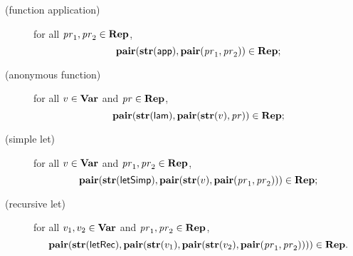 \begin{description}
\item[\quad(function application)] for all $\mathit{pr}_1,\mathit{pr}_2\in\mathbf{Rep}$,
  \begin{displaymath}
    \mathbf{pair}(\mathbf{str}(\mathsf{app}),
    \mathbf{pair}(\mathit{pr}_1, \mathit{pr}_2)) \in \mathbf{Rep} ;
  \end{displaymath}

\item[\quad(anonymous function)] for all $v\in\mathbf{Var}$ and
  $\mathit{pr}\in\mathbf{Rep}$,
  \begin{displaymath}
    \mathbf{pair}(\mathbf{str}(\mathsf{lam}),
    \mathbf{pair}(\mathbf{str}(v), \mathit{pr})) \in \mathbf{Rep} ;
  \end{displaymath}

\item[\quad(simple let)] for all $v\in\mathbf{Var}$ and
  $\mathit{pr}_1,\mathit{pr}_2\in\mathbf{Rep}$,
  \begin{displaymath}
    \mathbf{pair}(\mathbf{str}(\mathsf{letSimp}),
    \mathbf{pair}(\mathbf{str}(v),
    \mathbf{pair}(\mathit{pr}_1, \mathit{pr}_2))) \in \mathbf{Rep} ;
  \end{displaymath}

\item[\quad(recursive let)] for all $v_1,v_2\in\mathbf{Var}$ and
  $\mathit{pr}_1,\mathit{pr}_2\in\mathbf{Rep}$,
  \begin{displaymath}
    \mathbf{pair}(\mathbf{str}(\mathsf{letRec}),
    \mathbf{pair}(\mathbf{str}(v_1),
    \mathbf{pair}(\mathbf{str}(v_2),
    \mathbf{pair}(\mathit{pr}_1, \mathit{pr}_2)))) \in \mathbf{Rep} .
  \end{displaymath}
\end{description}

